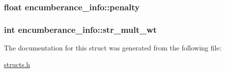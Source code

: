 \hypertarget{structencumberance__info_a2d805428c874845ca9df5a9c8d3b6345}{
\subsubsection[{penalty}]{\setlength{\rightskip}{0pt plus 5cm}float encumberance\-\_\-info\-::penalty}}\label{structencumberance__info_a2d805428c874845ca9df5a9c8d3b6345}
\hypertarget{structencumberance__info_aa2ea8e741a58ad10c50eb074fb35bfb2}{
\subsubsection[{str\-\_\-mult\-\_\-wt}]{\setlength{\rightskip}{0pt plus 5cm}int encumberance\-\_\-info\-::str\-\_\-mult\-\_\-wt}}\label{structencumberance__info_aa2ea8e741a58ad10c50eb074fb35bfb2}


The documentation for this struct was generated from the following file\-:\begin{DoxyCompactItemize}
\item 
\hyperlink{structs_8h}{structs.\-h}\end{DoxyCompactItemize}
